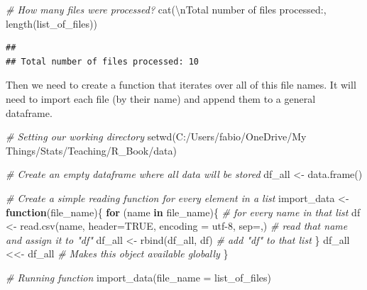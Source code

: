 \documentclass[
]{book}
\newenvironment{Shaded}{\begin{snugshade}}{\end{snugshade}}
\newcommand{\AttributeTok}[1]{\textcolor[rgb]{0.77,0.63,0.00}{#1}}
\newcommand{\CommentTok}[1]{\textcolor[rgb]{0.56,0.35,0.01}{\textit{#1}}}
\newcommand{\ConstantTok}[1]{\textcolor[rgb]{0.00,0.00,0.00}{#1}}
\newcommand{\ControlFlowTok}[1]{\textcolor[rgb]{0.13,0.29,0.53}{\textbf{#1}}}
\newcommand{\FunctionTok}[1]{\textcolor[rgb]{0.00,0.00,0.00}{#1}}
\newcommand{\NormalTok}[1]{#1}
\newcommand{\OtherTok}[1]{\textcolor[rgb]{0.56,0.35,0.01}{#1}}
\newcommand{\SpecialCharTok}[1]{\textcolor[rgb]{0.00,0.00,0.00}{#1}}
\newcommand{\StringTok}[1]{\textcolor[rgb]{0.31,0.60,0.02}{#1}}
\begin{document}
\begin{Shaded}
\begin{Highlighting}[]
\CommentTok{\# How many files were processed?}
\FunctionTok{cat}\NormalTok{(}\StringTok{\textquotesingle{}}\SpecialCharTok{\textbackslash{}n}\StringTok{Total number of files processed:\textquotesingle{}}\NormalTok{, }\FunctionTok{length}\NormalTok{(list\_of\_files))}
\end{Highlighting}
\end{Shaded}

\begin{verbatim}
## 
## Total number of files processed: 10
\end{verbatim}

Then we need to create a function that iterates over all of this file names.
It will need to import each file (by their name) and append them to a general dataframe.

\begin{Shaded}
\begin{Highlighting}[]
\CommentTok{\# Setting our working directory}
\FunctionTok{setwd}\NormalTok{(}\StringTok{\textquotesingle{}C:/Users/fabio/OneDrive/My Things/Stats/Teaching/R\_Book/data\textquotesingle{}}\NormalTok{)}

\CommentTok{\# Create an empty dataframe where all data will be stored}
\NormalTok{df\_all }\OtherTok{\textless{}{-}} \FunctionTok{data.frame}\NormalTok{()}

\CommentTok{\# Create a simple reading function for every element in a list}
\NormalTok{import\_data }\OtherTok{\textless{}{-}} \ControlFlowTok{function}\NormalTok{(file\_name)\{}
  \ControlFlowTok{for}\NormalTok{ (name }\ControlFlowTok{in}\NormalTok{ file\_name)\{  }\CommentTok{\# for every name in that list}
\NormalTok{    df }\OtherTok{\textless{}{-}} \FunctionTok{read.csv}\NormalTok{(name, }\AttributeTok{header=}\ConstantTok{TRUE}\NormalTok{, }\AttributeTok{encoding =} \StringTok{\textquotesingle{}utf{-}8\textquotesingle{}}\NormalTok{, }\AttributeTok{sep=}\StringTok{\textquotesingle{},\textquotesingle{}}\NormalTok{)  }\CommentTok{\# read that name and assign it to "df"}
\NormalTok{    df\_all }\OtherTok{\textless{}{-}} \FunctionTok{rbind}\NormalTok{(df\_all, df)  }\CommentTok{\# add "df" to that list   }
\NormalTok{  \}}
\NormalTok{  df\_all }\OtherTok{\textless{}\textless{}{-}}\NormalTok{ df\_all  }\CommentTok{\# Makes this object available globally}
\NormalTok{\}}

\CommentTok{\# Running function}
\FunctionTok{import\_data}\NormalTok{(}\AttributeTok{file\_name =}\NormalTok{ list\_of\_files)}
\end{Highlighting}
\end{Shaded}
\end{document}
